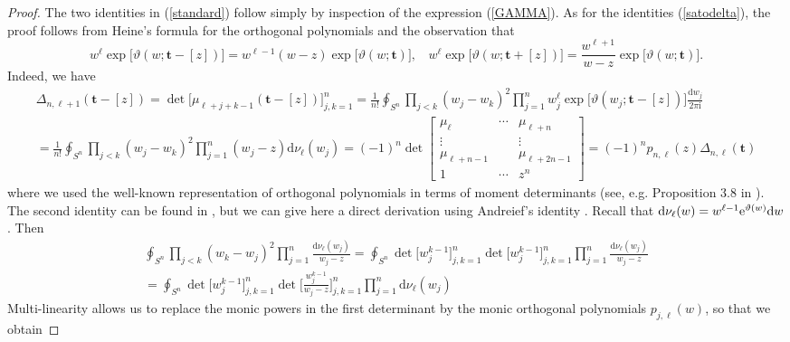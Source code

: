 \documentclass[10pt,reqno,oneside]{amsart}
\renewcommand{\d}{{\mathrm d}}
\newcommand{\im}{\mathrm{i}}
\numberwithin{equation}{section}
\newtheorem{theo}{Theorem}[section]
\def\bt{\begin{theo}}
\def\eqref#1{(\ref{#1})}
\def\bt{{\mathbf t}}
\begin{document}
\begin{proof}
The two identities in \eqref{standard} follow simply by inspection of the expression \eqref{GAMMA}. 
As for the identities \eqref{satodelta}, 
the  proof follows from Heine's formula for the orthogonal polynomials and the observation that 
\begin{equation*}
	w^{\ell} \exp\big[\vartheta(w; \bt - [z])\big] =  w^{\ell-1} (w-z)  \exp\big[\vartheta(w; \bt)\big],\ \ \ \ 
	w^{\ell} \exp\big[\vartheta(w; \bt + [z])\big] = \frac{w^{\ell+1}}{w-z}  \exp\big[\vartheta(w; \bt)\big].
\end{equation*}
Indeed, we have
\begin{align*}
	\Delta_{n,\ell+1}(\bt-[z])=\det\big[\mu_{\ell+j+k-1}(\bt-[z])\big] _{j,k=1}^n= \frac 1{n!} \oint_{S^n} \prod_{ j<k} (w_j - w_k)^2 \prod_{j=1}^n w_j^{\ell} \exp\big[
	\vartheta(w_j; \bt -[z])\big]\frac{\d w_j}{2\pi\im}\\
	=\frac 1{n!}  \oint_{S^n} \prod_{j<k} (w_j - w_k)^2 \prod_{j=1}^n (w_j-z) \d\nu_{\ell}(w_j)= (-1)^n\det\begin{bmatrix}
	\mu_{\ell} &\cdots & \mu_{\ell+n}\\
	\vdots &  & \vdots\\
	\mu_{\ell+n-1} &  & \mu_{\ell+2n-1}\\
	1 &  \cdots & z^n
	\end{bmatrix}= (-1)^np_{n,\ell}(z) \Delta_{n, \ell}(\bt) 
\end{align*}
where we used the well-known representation of orthogonal polynomials in terms of moment determinants (see, e.g. Proposition 3.8 in \cite{D}).
The second identity can be found in \cite{BDS}, but we can give here a direct derivation using Andreief's identity \cite{A}. Recall that $\d\nu_{\ell}(w)=w^{\ell-1}{\rm e}^{\vartheta(w)}\d w$. Then 
\begin{align}
	\oint_{S^n} \prod_{j<k}(w_k-w_j)^2 \prod_{j=1}^{n} \frac {\d\nu_{\ell}(w_j)}{w_j-z} = \oint_{S^n} \det \Big[w_j^{k-1}\Big]_{j,k=1}^n 
	\det\Big[w_j^{k-1}\Big]_{j,k=1}^n \prod_{j=1}^{n} \frac {\d\nu_{\ell}(w_j)}{w_j-z}\nonumber\\
	=\oint_{S^n} \det \Big[w_j^{k-1} \Big]_{j,k=1}^n\det \bigg[\frac{w_j^{k-1}}{w_j-z}\bigg]_{j,k=1}^n\prod_{j=1}^{n} {\d\nu_{\ell}(w_j)} \label{132}
\end{align}
Multi-linearity allows us to replace the monic powers in the first determinant by the monic orthogonal polynomials $p_{j,\ell}(w)$, so that we obtain

\end{proof}
\end{document}
